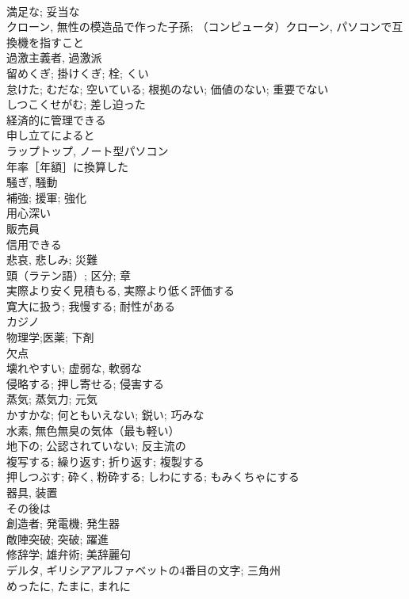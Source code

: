 \documentclass[8pt]{extreport}
\begin{document}
\begin{CJK}{UTF8}{min}
\\	満足な; 妥当な	
\\	クローン, 無性の模造品で作った子孫; （コンピュータ）クローン, パソコンで互換機を指すこと	
\\	過激主義者, 過激派	
\\	留めくぎ; 掛けくぎ; 栓; くい	
\\	怠けた; むだな; 空いている; 根拠のない; 価値のない; 重要でない	
\\	しつこくせがむ; 差し迫った	
\\	経済的に管理できる	
\\	申し立てによると	
\\	ラップトップ, ノート型パソコン	
\\	年率［年額］に換算した	
\\	騒ぎ, 騒動	
\\	補強; 援軍; 強化	
\\	用心深い	
\\	販売員	
\\	信用できる	
\\	悲哀, 悲しみ; 災難	
\\	頭（ラテン語）; 区分; 章	
\\	実際より安く見積もる, 実際より低く評価する	
\\	寛大に扱う; 我慢する; 耐性がある	
\\	カジノ	
\\	物理学;医薬; 下剤	
\\	欠点	
\\	壊れやすい; 虚弱な, 軟弱な	
\\	侵略する; 押し寄せる; 侵害する	
\\	蒸気; 蒸気力; 元気	
\\	かすかな; 何ともいえない; 鋭い; 巧みな	
\\	水素, 無色無臭の気体（最も軽い）	
\\	地下の; 公認されていない; 反主流の	
\\	複写する; 繰り返す; 折り返す; 複製する	
\\	押しつぶす; 砕く, 粉砕する; しわにする; もみくちゃにする	
\\	器具, 装置	
\\	その後は	
\\	創造者; 発電機; 発生器	
\\	敵陣突破; 突破; 躍進	
\\	修辞学; 雄弁術; 美辞麗句	
\\	デルタ, ギリシアアルファベットの4番目の文字; 三角州	
\\	めったに, たまに, まれに	

\end{CJK}
\end{document}
